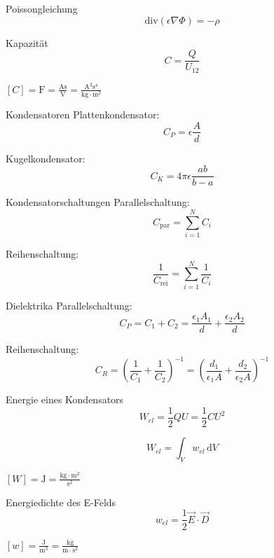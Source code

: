 \documentclass[a7paper]{kartei}
\begin{document}
\begin{karte}[Elektrostatik]{Poissongleichung}
\[
\text{div} (\epsilon \nabla \Phi) = -\rho
\]
\end{karte}

\begin{karte}[Elektrostatik]{Kapazität}
\[
C = \frac{Q}{U_{12}}
\]

\([C] = \text{F} = \frac{\text{As}}{\text{V}} = \frac{\text{A}^2\text{s}^4}{\text{kg} \cdot \text{m}^2}\)
\end{karte}

\begin{karte}[Elektrostatik]{Kondensatoren}
Plattenkondensator:
\[
C_P = \epsilon \frac{A}{d}
\]

Kugelkondensator:
\[
C_K = 4\pi \epsilon \frac{ab}{b - a}
\]
\end{karte}

\begin{karte}[Elektrostatik]{Kondensatorschaltungen}
Parallelschaltung:
\[
C_{\text{par}} = \sum_{i=1}^{N} C_i
\]

Reihenschaltung:
\[
\frac{1}{C_{\text{rei}}} = \sum_{i=1}^{N} \frac{1}{C_i}
\]
\end{karte}

\begin{karte}[Elektrostatik]{Dielektrika}
Parallelschaltung:
\[
C_P = C_1 + C_2 = \frac{\epsilon_1 A_1}{d} + \frac{\epsilon_2 A_2}{d}
\]

Reihenschaltung:
\[
C_R = \left(\frac{1}{C_1} + \frac{1}{C_2}\right)^{-1} = \left(\frac{d_1}{\epsilon_1 A} + \frac{d_2}{\epsilon_2 A}\right)^{-1}
\]
\end{karte}

\begin{karte}[Elektrostatik]{Energie eines Kondensators}
\[
W_{el} = \frac{1}{2} Q U = \frac{1}{2} C U^2
\]

\[
W_{el} = \int_V w_{el} \, \mathrm{d}V
\]

\([W] = \text{J} = \frac{\text{kg} \cdot \text{m}^2}{\text{s}^2}\)
\end{karte}

\begin{karte}[Elektrostatik]{Energiedichte des E-Felds}
\[
w_{el} = \frac{1}{2} \vec{E} \cdot \vec{D}
\]

\([w] = \frac{\text{J}}{\text{m}^3} = \frac{\text{kg}}{\text{m} \cdot \text{s}^2}\)
\end{karte}
\end{document}
